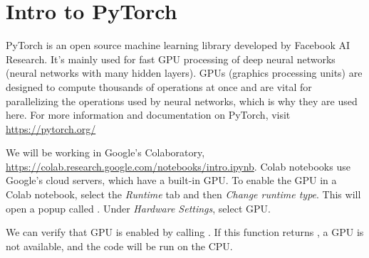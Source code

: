 \section*{Intro to PyTorch}

PyTorch is an open source machine learning library developed by Facebook AI Research.
It's mainly used for fast GPU processing of deep neural networks (neural networks with many hidden layers).
GPUs (graphics processing units) are designed to compute thousands of operations at once and are vital for parallelizing the operations used by neural networks, which is why they are used here.
For more information and documentation on PyTorch, visit \url{https://pytorch.org/}


We will be working in Google's Colaboratory, \url{https://colab.research.google.com/notebooks/intro.ipynb}.
Colab notebooks use Google's cloud servers, which have a built-in GPU.
To enable the GPU in a Colab notebook, select the \textit{Runtime} tab and then \textit{Change runtime type}.
This will open a popup called .
Under \textit{Hardware Settings}, select GPU.

We can verify that GPU is enabled by calling .
If this function returns , a GPU is not available, and the code will be run on the CPU.


